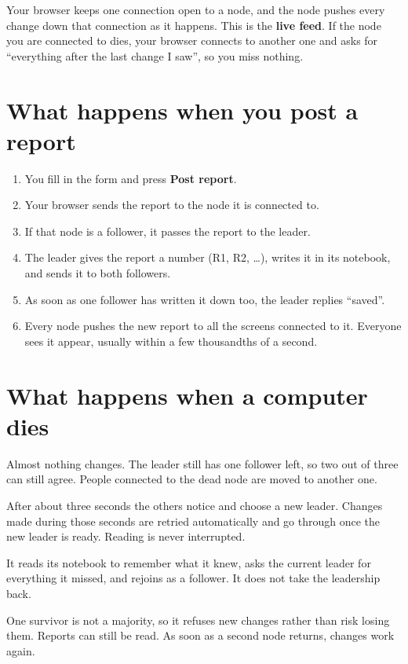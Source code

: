 \documentclass[11pt,a4paper]{article}
\newcommand{\term}[1]{\textbf{\textcolor{accent}{#1}}}
\newcommand{\ui}[1]{\textsf{\textbf{#1}}}
\begin{document}
Your browser keeps one connection open to a node, and the node pushes every change down that
connection as it happens. This is the \term{live feed}. If the node you are connected to dies,
your browser connects to another one and asks for ``everything after the last change I saw'', so
you miss nothing.

\section{What happens when you post a report}

\begin{enumerate}
\item You fill in the form and press \ui{Post report}.
\item Your browser sends the report to the node it is connected to.
\item If that node is a follower, it passes the report to the leader.
\item The leader gives the report a number (R1, R2, \dots), writes it in its notebook, and sends
it to both followers.
\item As soon as one follower has written it down too, the leader replies ``saved''.
\item Every node pushes the new report to all the screens connected to it. Everyone sees it
appear, usually within a few thousandths of a second.
\end{enumerate}

\section{What happens when a computer dies}

\begin{description}[style=nextline,leftmargin=0.6cm]
\item[A follower dies.] Almost nothing changes. The leader still has one follower left, so two
out of three can still agree. People connected to the dead node are moved to another one.
\item[The leader dies.] After about three seconds the others notice and choose a new leader.
Changes made during those seconds are retried automatically and go through once the new leader is
ready. Reading is never interrupted.
\item[The dead computer comes back.] It reads its notebook to remember what it knew, asks the
current leader for everything it missed, and rejoins as a follower. It does not take the
leadership back.
\item[Two computers die.] One survivor is not a majority, so it refuses new changes rather than
risk losing them. Reports can still be read. As soon as a second node returns, changes work again.
\end{description}
\end{document}
